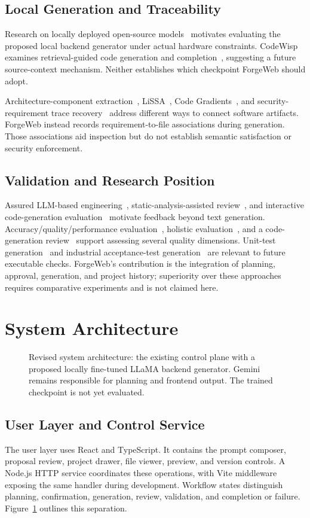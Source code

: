\documentclass[conference,a4paper]{IEEEtran}
\begin{document}
\subsection{Local Generation and Traceability}
Research on locally deployed open-source models~\cite{ieee9} motivates evaluating the proposed local backend generator under actual hardware constraints. CodeWisp examines retrieval-guided code generation and completion~\cite{ieee10}, suggesting a future source-context mechanism. Neither establishes which checkpoint ForgeWeb should adopt.

Architecture-component extraction~\cite{ieee8}, LiSSA~\cite{ieee15}, Code Gradients~\cite{ieee16}, and security-requirement trace recovery~\cite{ieee17} address different ways to connect software artifacts. ForgeWeb instead records requirement-to-file associations during generation. Those associations aid inspection but do not establish semantic satisfaction or security enforcement.

\subsection{Validation and Research Position}
Assured LLM-based engineering~\cite{ieee11}, static-analysis-assisted review~\cite{ieee12}, and interactive code-generation evaluation~\cite{ieee21} motivate feedback beyond text generation. Accuracy/quality/performance evaluation~\cite{ieee14}, holistic evaluation~\cite{ieee22}, and a code-generation review~\cite{ieee23} support assessing several quality dimensions. Unit-test generation~\cite{ieee24} and industrial acceptance-test generation~\cite{ieee25} are relevant to future executable checks. ForgeWeb's contribution is the integration of planning, approval, generation, and project history; superiority over these approaches requires comparative experiments and is not claimed here.

\section{System Architecture}
\begin{figure}[!t]
\centering

\caption{Revised system architecture: the existing control plane with a proposed locally fine-tuned LLaMA backend generator. Gemini remains responsible for planning and frontend output. The trained checkpoint is not yet evaluated.}
\label{fig:architecture}
\end{figure}
\subsection{User Layer and Control Service}
The user layer uses React and TypeScript. It contains the prompt composer, proposal review, project drawer, file viewer, preview, and version controls. A Node.js HTTP service coordinates these operations, with Vite middleware exposing the same handler during development. Workflow states distinguish planning, confirmation, generation, review, validation, and completion or failure. Figure~\ref{fig:architecture} outlines this separation.
\end{document}
